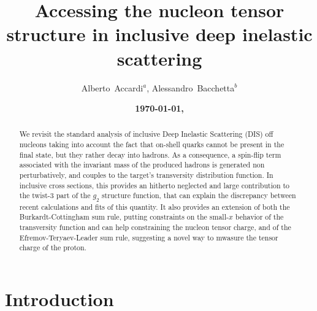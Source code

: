 \documentclass[preprintnumbers,floatfix,nofootinbib]{revtex4}
\begin{document}


\title{Accessing the nucleon tensor structure in inclusive deep inelastic scattering} 

\author{Alberto~Accardi$^{a}$, Alessandro~Bacchetta$^{b}$} 

\date{\bf \today, \currenttime}

\begin{abstract}
We revisit the standard analysis of inclusive Deep Inelastic Scattering (DIS)
off nucleons taking into
account the fact that on-shell quarks cannot be present in the final state,
but they rather decay into hadrons. As a consequence, a spin-flip term
associated with the invariant mass of the produced hadrons is generated
non perturbatively, and couples to the target's transversity distribution
function. In inclusive cross sections, this provides an hitherto neglected and
large contribution to the twist-3 part of the $g_2$ structure function, that
can explain the discrepancy between recent calculations and fits of this
quantity. It also provides an extension of both the Burkardt-Cottingham sum rule, putting constraints on the small-$x$ behavior of the transversity
function and can help constraining the nucleon tensor charge, and of the Efremov-Teryaev-Leader sum rule, suggesting a novel way to mwasure the tensor charge of the proton. 
\end{abstract}



\maketitle


\section{Introduction}
\end{document}
